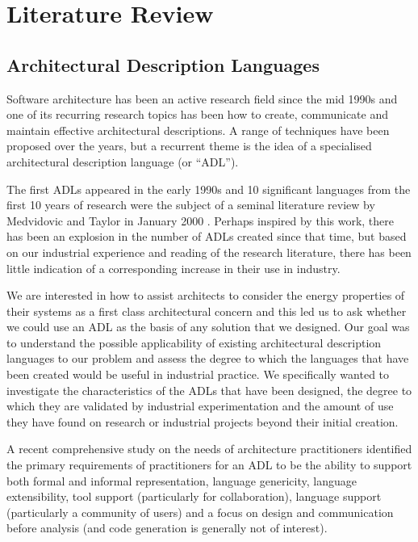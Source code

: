 \chapter{Literature Review} \label{chapter:lit-review}

\section{Architectural Description Languages} \label{sec:adl-lit-review}

Software architecture has been an active research field since the mid 1990s and one of its recurring research topics has been how to create, communicate and maintain effective architectural descriptions.  A range of techniques have been proposed over the years, but a recurrent theme is the idea of a specialised architectural description language (or “ADL”).

The first ADLs appeared in the early 1990s and 10 significant languages from the first 10 years of research were the subject of a seminal literature review by Medvidovic and Taylor in January 2000 \cite{medvidovic2000-adlcomparison}.  Perhaps inspired by this work, there has been an explosion in the number of ADLs created since that time, but based on our industrial experience and reading of the research literature, there has been little indication of a corresponding increase in their use in industry.  

We are interested in how to assist architects to consider the energy properties of their systems as a first class architectural concern and this led us to ask whether we could use an ADL as the basis of any solution that we designed.  Our goal was to understand the possible applicability of existing architectural description languages to our problem and assess the degree to which the languages that have been created would be useful in industrial practice.  We specifically wanted to investigate the characteristics of the ADLs that have been designed, the degree to which they are validated by industrial experimentation and the amount of use they have found on research or industrial projects beyond their initial creation.

A recent comprehensive study on the needs of architecture practitioners \cite{malavolta2013-industryadlneeds} identified the primary requirements of practitioners for an ADL to be the ability to support both formal and informal representation, language genericity, language extensibility, tool support (particularly for collaboration), language support (particularly a community of users) and a focus on design and communication before analysis (and code generation is generally not of interest).

